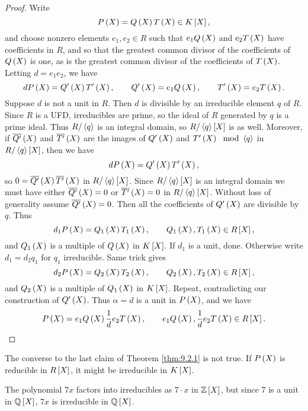 \begin{proof}
Write
$$ P\rb{X} = Q\rb{X}T\rb{X} \in K\sb{X}, $$
and choose nonzero elements $ e_1, e_2 \in R $ such that $ e_1Q\rb{X} $ and $ e_2T\rb{X} $ have coefficients in $ R $, and so that the greatest common divisor of the coefficients of $ Q\rb{X} $ is one, as is the greatest common divisor of the coefficients of $ T\rb{X} $. Letting $ d = e_1e_2 $, we have
$$ dP\rb{X} = Q'\rb{X}T'\rb{X}, \qquad Q'\rb{X} = e_1Q\rb{X}, \qquad T'\rb{X} = e_2T\rb{X}. $$
Suppose $ d $ is not a unit in $ R $. Then $ d $ is divisible by an irreducible element $ q $ of $ R $. Since $ R $ is a UFD, irreducibles are prime, so the ideal of $ R $ generated by $ q $ is a prime ideal. Thus $ R / \ab{q} $ is an integral domain, so $ R / \ab{q}\sb{X} $ is as well. Moreover, if $ \overline{Q'}\rb{X} $ and $ \overline{T'}\rb{X} $ are the images of $ Q'\rb{X} $ and $ T'\rb{X} \mod \ab{q} $ in $ R / \ab{q}\sb{X} $, then we have
$$ dP\rb{X} = Q'\rb{X}T'\rb{X}, $$
so $ 0 = \overline{Q'}\rb{X}\overline{T'}\rb{X} $ in $ R / \ab{q}\sb{X} $. Since $ R / \ab{q}\sb{X} $ is an integral domain we must have either $ \overline{Q'}\rb{X} = 0 $ or $ \overline{T'}\rb{X} = 0 $ in $ R / \ab{q}\sb{X} $. Without loss of generality assume $ \overline{Q'}\rb{X} = 0 $. Then all the coefficients of $ Q'\rb{X} $ are divisible by $ q $. Thus
$$ d_1P\rb{X} = Q_1\rb{X}T_1\rb{X}, \qquad Q_1\rb{X}, T_1\rb{X} \in R\sb{X}, $$
and $ Q_1\rb{X} $ is a multiple of $ Q\rb{X} $ in $ K\sb{X} $. If $ d_1 $ is a unit, done. Otherwise write $ d_1 = d_2q_1 $ for $ q_1 $ irreducible. Same trick gives
$$ d_2P\rb{X} = Q_2\rb{X}T_2\rb{X}, \qquad Q_2\rb{X}, T_2\rb{X} \in R\sb{X}, $$
and $ Q_2\rb{X} $ is a multiple of $ Q_1\rb{X} $ in $ K\sb{X} $. Repeat, contradicting our construction of $ Q'\rb{X} $. Thus $ \alpha = d $ is a unit in $ P\rb{X} $, and we have
$$ P\rb{X} = e_1Q\rb{X}\dfrac{1}{d}e_2T\rb{X}, \qquad e_1Q\rb{X}, \dfrac{1}{d}e_2T\rb{X} \in R\sb{X}. $$
\end{proof}

\begin{note*}
The converse to the last claim of Theorem \ref{thm:9.2.1} is not true. If $ P\rb{X} $ is reducible in $ R\sb{X} $, it might be irreducible in $ K\sb{X} $.
\end{note*}

\begin{example*}
The polynomial $ 7x $ factors into irreducibles as $ 7 \cdot x $ in $ \Z\sb{X} $, but since $ 7 $ is a unit in $ \Q\sb{X} $, $ 7x $ is irreducible in $ \Q\sb{X} $.
\end{example*}

